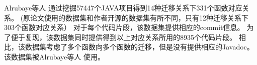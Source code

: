 \documentclass[UTF8]{ctexart}
\begin{document}
Alrubaye等人\cite{2018CASCON-Alrubaye-Automating} \cite{API2018}通过挖掘57447个JAVA项目得到14种迁移关系下331个函数对应关系。
(原论文使用的数据集和作者开源的数据集有所不同，只有12种迁移关系下303个函数对应关系）
对于每个代码片段，该数据集提供相应的commit信息。
为了便于复现，该数据集同时提供得到以上对应关系所用的8935个代码片段。
相比\cite{API2013}，该数据集考虑了多个函数向多个函数的迁移，但是没有提供相应的Javadoc。
该数据集被Alrubaye等人\cite{2019ICPC-Alrubaye-On} \cite{2019Arxiv-Alrubaye-Learning}使用。

\end{document}
